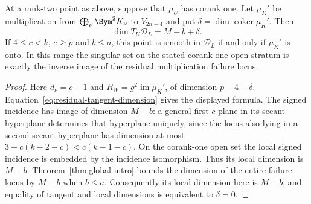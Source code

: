 \begin{corollary}
\label{cor:residual-singularity}
At a rank-two point as above, suppose that $\mu_U$ has corank one.
Let $\mu_K'$ be multiplication from $\bigoplus_\nu\Sym^2K_\nu$ to
$V_{2n-4}$ and put $\delta=\dim\operatorname{coker}\mu_K'$.
Then
\begin{equation}\label{eq:rank-two-tangent-excess}
 \dim T_U\mathscr D_L=M-b+\delta.
\end{equation}
If $4\le c<k$, $e\ge p$ and $b\le a$, this point is smooth in
$\mathscr D_L$ if and only if $\mu_K'$ is onto. In this range the
singular set on the stated corank-one open stratum is exactly the inverse
image of the residual multiplication failure locus.
\end{corollary}
\begin{proof}
Here $d_\nu=c-1$ and
$R_W=g^2\operatorname{im}\mu_K'$, of dimension $p-4-\delta$.
Equation~\eqref{eq:residual-tangent-dimension} gives the displayed formula.
The signed incidence has image of dimension $M-b$: a general first
$c$-plane in its secant hyperplane determines that hyperplane uniquely,
since the locus also lying in a second secant hyperplane has dimension
at most $3+c(k-2-c)<c(k-1-c)$. On the corank-one open set the local
signed incidence is embedded by the incidence isomorphism. Thus its
local dimension is $M-b$. Theorem~\ref{thm:global-intro} bounds the
dimension of the entire failure locus by $M-b$ when $b\le a$.
Consequently its local dimension here is $M-b$, and equality of tangent
and local dimensions is equivalent to $\delta=0$.
\end{proof}

